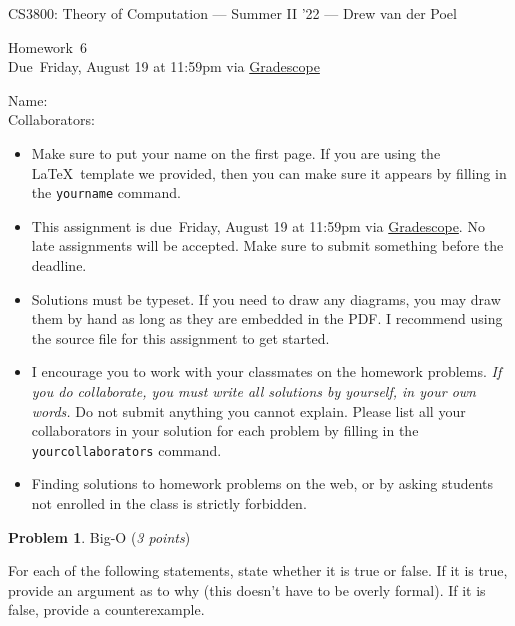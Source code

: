 \documentclass[11pt]{article}
\newcommand{\yourname}{}
\newcommand{\yourcollaborators}{}
\theoremstyle{definition}
\newcommand{\instructor}{Drew van der Poel}
\newcommand{\hwnum}{6}
\newcommand{\hwdue}{Friday, August 19 at 11:59pm via \href{https://www.gradescope.com/courses/406943}{Gradescope}}
\theoremstyle{theorem}
\newtheorem{prob}{Problem}
\begin{document}
{\Large 
\begin{center}{CS3800: Theory of Computation} --- Summer II '22 --- \instructor \end{center}}
{\large
\vspace{10pt}
\noindent Homework~\hwnum \vspace{2pt}\\
Due~\hwdue}

\bigskip
{\large
\noindent Name: \yourname \vspace{2pt}\\ Collaborators: \yourcollaborators}

\vspace{15pt}
\begin{itemize}

\item Make sure to put your name on the first page.  If you are using the \LaTeX~template we provided, then you can make sure it appears by filling in the \texttt{yourname} command.

\item This assignment is due~\hwdue.  No late assignments will be accepted.  Make sure to submit something before the deadline.

\item Solutions must be typeset.  If you need to draw any diagrams, you may draw them by hand as long as they are embedded in the PDF.  I recommend using the source file for this assignment to get started.

\item I encourage you to work with your classmates on the homework problems. \emph{If you do collaborate, you must write all solutions by yourself, in your own words.}  Do not submit anything you cannot explain.  Please list all your collaborators in your solution for each problem by filling in the \texttt{yourcollaborators} command.

\item Finding solutions to homework problems on the web, or by asking students not enrolled in the class is strictly forbidden.

\end{itemize}


\newpage

\begin{prob} Big-O (\emph{3 points})\end{prob}

For each of the following statements, state whether it is true or false. If it is true, provide an argument as to why (this doesn't have to be overly formal). If it is false, provide a counterexample. 
\end{document}
